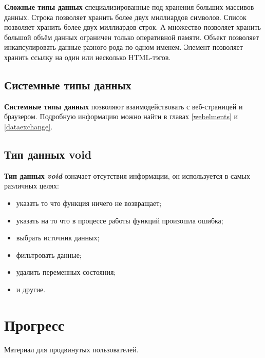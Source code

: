 \documentclass[a4paper, 14pt, russian]{extarticle}
\newenvironment{icItems}
	{ \begin{itemize} [noitemsep,nolistsep] }
	{ \end{itemize} }
\begin{document}
	{\bf Сложные типы данных} специализированные под хранения больших массивов данных. Строка позволяет хранить более двух миллиардов символов. Список позволяет хранить более двух миллиардов строк. А множество позволяет хранить большой объём данных ограничен только оперативной памяти. Объект позволяет инкапсулировать данные разного рода по одном именем. Элемент позволяет хранить ссылку на один или несколько HTML-тэгов.

\subsection{Системные типы данных}

	{\bf Системные типы данных} позволяют взаимодействовать с веб-страницей и браузером. Подробную информацию можно найти в главах \ref{webelments} и \ref{dataexchange}.
	
\subsection{Тип данных void}

	{\bf Тип данных {\it void}} означает отсутствия информации, он используется в самых различных целях:
\begin{icItems}
	\item указать то что функция ничего не возвращает;
	\item указать на то что в процессе работы функций произошла ошибка;
	\item выбрать источник данных;
	\item фильтровать данные;
	\item удалить переменных состояния;
	\item и другие.
\end{icItems}

\newpage
\section{Прогресс}

{\color{red}Материал для продвинутых пользователей.}
  	
\end{document}
